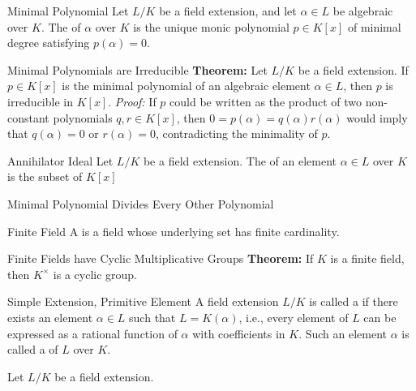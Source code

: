 \documentclass[12pt]{report}
\begin{document}
\begin{dfnbox}{Minimal Polynomial}
	Let $L/K$ be a field extension, and let $\alpha \in L$ be algebraic over $K$. The  of $\alpha$ over $K$ is the unique monic polynomial $p \in K[x]$ of minimal degree satisfying $p(\alpha) = 0$.
\end{dfnbox}

\begin{thmbox}{Minimal Polynomials are Irreducible}
	\textbf{Theorem:} Let $L/K$ be a field extension. If $p \in K[x]$ is the minimal polynomial of an algebraic element $\alpha \in L$, then $p$ is irreducible in $K[x]$.
\tcblower
	\textit{Proof:} If $p$ could be written as the product of two non-constant polynomials $q, r \in K[x]$, then $0 = p(\alpha) = q(\alpha) r(\alpha)$ would imply that $q(\alpha) = 0$ or $r(\alpha) = 0$, contradicting the minimality of $p$.
\end{thmbox}

\begin{dfnbox}{Annihilator Ideal}
	Let $L/K$ be a field extension. The  of an element $\alpha \in L$ over $K$ is the subset of $K[x]$
\end{dfnbox}

\begin{thmbox}{Minimal Polynomial Divides Every Other Polynomial}
\end{thmbox}

\begin{dfnbox}{Finite Field}
	A  is a field whose underlying set has finite cardinality.
\end{dfnbox}

\begin{thmbox}{Finite Fields have Cyclic Multiplicative Groups}
	\textbf{Theorem:} If $K$ is a finite field, then $K^\times$ is a cyclic group.
\end{thmbox}

\begin{dfnbox}{Simple Extension, Primitive Element}
	A field extension $L/K$ is called a  if there exists an element $\alpha \in L$ such that $L = K(\alpha)$, i.e., every element of $L$ can be expressed as a rational function of $\alpha$ with coefficients in $K$. Such an element $\alpha$ is called a  of $L$ over $K$.
\end{dfnbox}

\begin{dfnbox}{}
	Let $L/K$ be a field extension.
\end{dfnbox}
\end{document}
